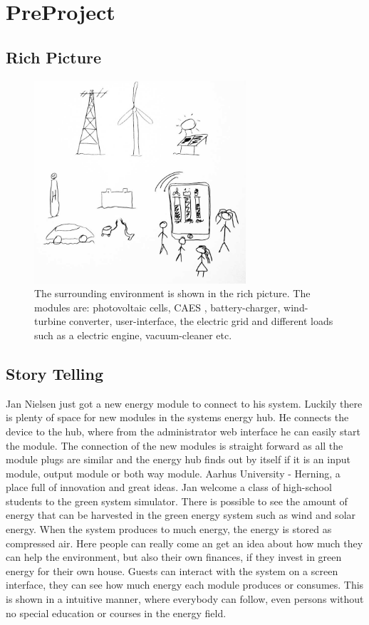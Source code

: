 \chapter{PreProject}
\section{Rich Picture}

\begin{figure}[H]
 \begin{centering}
  \includegraphics[width=0.7\textwidth]{images/rich_picture1.png}
   \caption{The surrounding environment is shown in the rich picture. The
 			 modules are: photovoltaic cells, CAES , battery-charger, wind-turbine
 			 converter, user-interface, the electric grid and different loads such as a
 			electric engine, vacuum-cleaner etc. }
 \end{centering}
\end{figure}

\section{Story Telling}
Jan Nielsen just got a new energy module to connect to his system. Luckily there is plenty of space
for new modules in the systems energy hub. He connects the device to the hub, where from the administrator web interface he can easily start the module.
The connection of the new modules is straight forward as all the module plugs are similar and the energy hub finds out by itself
if it is an input module, output module or both way module.
\p
Aarhus University - Herning, a place full of innovation and great ideas. Jan welcome a class of high-school students to the green system simulator. There
is possible to see the amount of energy that can be harvested in the green energy system
such as wind and solar energy. When the system produces to much energy, the 
energy is stored as compressed air. Here people can really come an get an idea about 
how much they can help the environment, but also their own finances, if they invest in green energy for their own house.
\p
Guests can interact with the system on a screen interface, they can see how much energy each module 
produces or consumes. This is shown in a intuitive manner, where everybody can follow, 
even persons without no special education or courses in the energy field.

